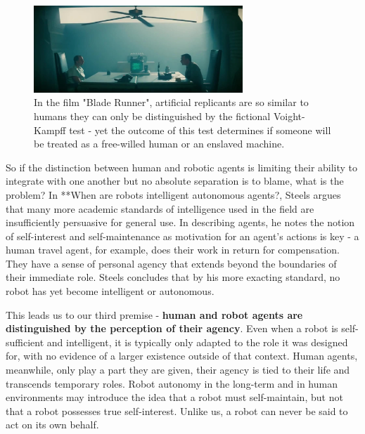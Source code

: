 \documentclass{sfuthesis}
\begin{document}
\begin{figure}
    \centering
    \includegraphics[width=0.7\textwidth]{voight.jpg} 

    \caption{In the film "Blade Runner", artificial replicants are so similar to humans they can only be distinguished by the fictional Voight-Kampff test - yet the outcome of this test determines if someone will be treated as a free-willed human or an enslaved machine.}
    \label{fig:voight}
\end{figure}

So if the distinction between human and robotic agents is limiting their ability to integrate with one another but no absolute separation is to blame, what is the problem? In **When are robots intelligent autonomous agents?, Steels argues that many more academic standards of intelligence used in the field are insufficiently persuasive for general use. In describing agents, he notes the notion of self-interest and self-maintenance as motivation for an agent's actions is key - a human travel agent, for example, does their work in return for compensation. They have a sense of personal agency that extends beyond the boundaries of their immediate role. Steels concludes that by his more exacting standard, no robot has yet become intelligent or autonomous.




This leads us to our third premise - \textbf{human and robot agents are distinguished by the perception of their agency}. Even when a robot is self-sufficient and intelligent, it is typically only adapted to the role it was designed for, with no evidence of a larger existence outside of that context. Human agents, meanwhile, only play a part they are given, their agency is tied to their life and transcends temporary roles. Robot autonomy in the long-term and in human environments may introduce the idea that a robot must self-maintain, but not that a robot possesses true self-interest. Unlike us, a robot can never be said to act on its own behalf.
\end{document}
